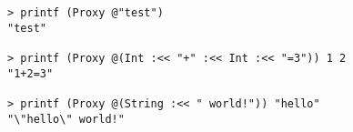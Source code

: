 \begin{repl}\begin{lstlisting}
> printf (Proxy @"test")
"test"

> printf (Proxy @(Int :<< "+" :<< Int :<< "=3")) 1 2
"1+2=3"

> printf (Proxy @(String :<< " world!")) "hello"
"\"hello\" world!"\end{lstlisting}\end{repl}
